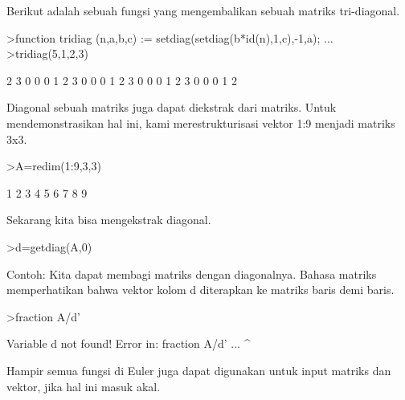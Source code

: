 \documentclass[a4paper,10pt]{article}
\begin{document}
\begin{eulernotebook}
\begin{eulercomment}
\begin{eulercomment}
\begin{eulercomment}
\begin{eulercomment}
\begin{eulercomment}
\begin{eulercomment}
\begin{eulercomment}
Berikut adalah sebuah fungsi yang mengembalikan sebuah matriks
tri-diagonal.
\end{eulercomment}
\begin{eulerprompt}
>function tridiag (n,a,b,c) := setdiag(setdiag(b*id(n),1,c),-1,a); ...
>tridiag(5,1,2,3)
\end{eulerprompt}
\begin{euleroutput}
              2             3             0             0             0 
              1             2             3             0             0 
              0             1             2             3             0 
              0             0             1             2             3 
              0             0             0             1             2 
\end{euleroutput}
\begin{eulercomment}
Diagonal sebuah matriks juga dapat diekstrak dari matriks. Untuk
mendemonstrasikan hal ini, kami merestrukturisasi vektor 1:9 menjadi
matriks 3x3.
\end{eulercomment}
\begin{eulerprompt}
>A=redim(1:9,3,3)
\end{eulerprompt}
\begin{euleroutput}
              1             2             3 
              4             5             6 
              7             8             9 
\end{euleroutput}
\begin{eulercomment}
Sekarang kita bisa mengekstrak diagonal.
\end{eulercomment}
\begin{eulerprompt}
>d=getdiag(A,0)
\end{eulerprompt}
\begin{euleroutput}
  [1,  5,  9]
\end{euleroutput}
\begin{eulercomment}
Contoh: Kita dapat membagi matriks dengan diagonalnya. Bahasa matriks
memperhatikan bahwa vektor kolom d diterapkan ke matriks baris demi
baris.
\end{eulercomment}
\begin{eulerprompt}
>fraction A/d'
\end{eulerprompt}
\begin{euleroutput}
  Variable d not found!
  Error in:
  fraction A/d' ...
               ^
\end{euleroutput}
\begin{eulercomment}
Hampir semua fungsi di Euler juga dapat digunakan untuk input matriks
dan vektor, jika hal ini masuk akal.


\end{eulercomment}
\end{eulercomment}
\end{eulercomment}
\end{eulercomment}
\end{eulercomment}
\end{eulercomment}
\end{eulercomment}
\end{eulernotebook}
\end{document}
